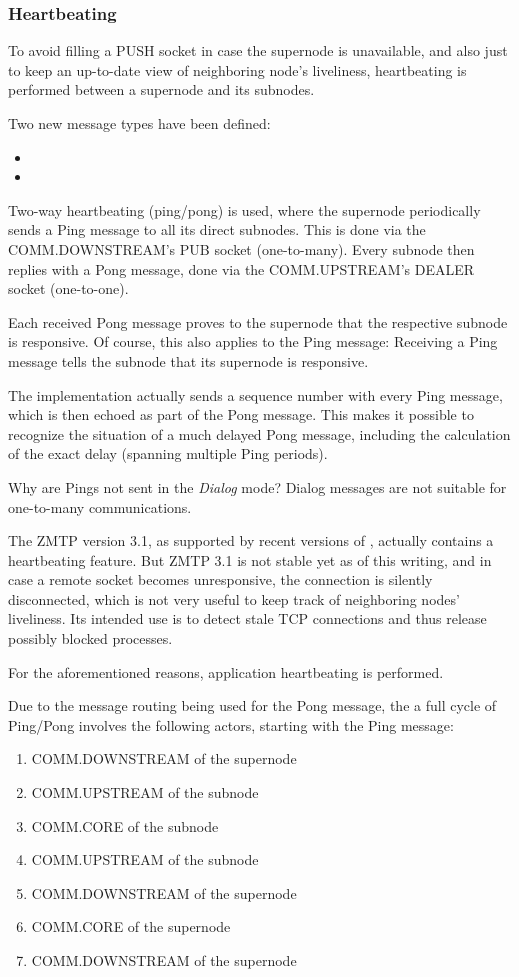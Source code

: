 \subsubsection{Heartbeating}\label{sec:approach:hb}
To avoid filling a PUSH socket in case the supernode is unavailable, and also
just to keep an up-to-date view of neighboring node's liveliness, heartbeating
is performed between a supernode and its subnodes.


Two new message types have been defined:
\begin{itemize}
	\item {}
	\item {}
\end{itemize}

Two-way heartbeating (ping/pong) is used, where the supernode periodically
sends a Ping message to all its direct
subnodes. This is done via the COMM.DOWNSTREAM's PUB socket (one-to-many).
Every subnode then replies with a Pong
message, done via the COMM.UPSTREAM's DEALER socket (one-to-one).

Each received Pong message proves to the supernode that the respective subnode
is responsive. Of course, this also applies to the Ping message: Receiving a
Ping message tells the subnode that its supernode is responsive.

The implementation actually sends a sequence number with every Ping message,
which is then echoed as part of the Pong message. This makes it possible to
recognize the situation of a much delayed Pong message, including the
calculation of the exact delay (spanning multiple Ping periods).

Why are Pings not sent in the \emph{Dialog} mode? Dialog messages are not
suitable for one-to-many communications.

The \gls{ZMTP} version 3.1, as supported by recent versions of \zmq, actually
contains a heartbeating feature. But ZMTP 3.1 is not stable yet as of this
writing, and in case a remote socket becomes unresponsive, the connection is
silently disconnected, which is not very useful to keep track of neighboring
nodes' liveliness. Its intended use is to detect stale TCP connections and thus
release possibly blocked processes.

For the aforementioned reasons, application heartbeating is performed.

Due to the message routing being used for the Pong message, the a full cycle of
Ping/Pong involves the following actors, starting with the Ping message:
\begin{enumerate}
	\item COMM.DOWNSTREAM of the supernode
	\item COMM.UPSTREAM  of the subnode
	\item COMM.CORE of the subnode
	\item COMM.UPSTREAM of the subnode
	\item COMM.DOWNSTREAM of the supernode
	\item COMM.CORE of the supernode
	\item COMM.DOWNSTREAM of the supernode
\end{enumerate}

